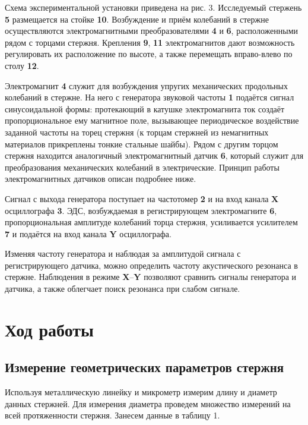 \documentclass[a4paper, 12pt]{article}
\begin{document}
    Схема экспериментальной установки приведена на рис. 3. Исследуемый
    стержень \textbf{5} размещается на стойке \textbf{10}. Возбуждение и приём колебаний в
    стержне осуществляются электромагнитными преобразователями \textbf{4} и \textbf{6},
    расположенными рядом с торцами стержня. Крепления \textbf{9}, \textbf{11} электромагнитов дают  возможность регулировать их расположение по высоте, а
    также перемещать вправо-влево по столу \textbf{12}.

    Электромагнит \textbf{4} служит для возбуждения упругих механических продольных колебаний в стержне. На него с генератора звуковой частоты \textbf{1} подаётся сигнал синусоидальной формы: протекающий в катушке электромагнита ток создаёт пропорциональное ему магнитное поле, вызывающее периодическое воздействие заданной частоты на торец стержня (к торцам
    стержней из немагнитных материалов прикреплены тонкие стальные
    шайбы). Рядом с другим торцом стержня находится аналогичный электромагнитный датчик \textbf{6}, который служит для преобразования механических
    колебаний в электрические. Принцип работы электромагнитных датчиков
    описан подробнее ниже.

    Сигнал с выхода генератора поступает на частотомер \textbf{2} и на вход
    канала \textbf{X} осциллографа \textbf{3}. ЭДС, возбуждаемая в регистрирующем электромагните \textbf{6}, пропорциональная амплитуде колебаний торца стержня, усиливается усилителем \textbf{7} и подаётся на вход канала \textbf{Y} осциллографа.

    Изменяя частоту генератора и наблюдая за амплитудой сигнала с регистрирующего датчика, можно определить частоту акустического резонанса в стержне. Наблюдения в режиме \textbf{X}–\textbf{Y} позволяют сравнить сигналы генератора и датчика, а также облегчает поиск резонанса при слабом сигнале.
    \newpage
    \section{Ход работы}
    \subsection{Измерение геометрических параметров стержня}

    Используя металлическую линейку и микрометр измерим длину и диаметр данных стержней. Для измерения диаметра проведем множество измерений на всей протяженности стержня. Занесем данные в таблицу 1.
    
\end{document}
